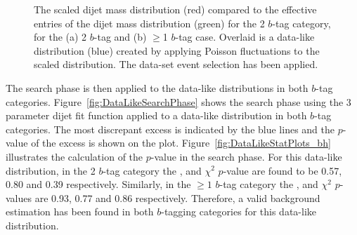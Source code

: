 \begin{figure}[!ht]
  \begin{center}
   \captionsetup[subfigure]{aboveskip=0pt,justification=centering}
  \end{center}
  \caption{The scaled dijet mass distribution (red) compared to the
    effective entries of the dijet mass distribution (green) for the 2 $b$-tag category,
    for the (a) 2 $b$-tag and (b) $\geq$1 $b$-tag case.
    Overlaid is a data-like distribution (blue) created by applying Poisson fluctuations to the scaled distribution.
    The \summer{} data-set event selection has been applied.}
  \label{fig:effEntDataLike}
\end{figure}

The search phase is then applied to the data-like distributions
in both $b$-tag categories.
Figure~\ref{fig:DataLikeSearchPhase} shows the search phase 
using the 3 parameter dijet fit function
applied to a  data-like distribution in both $b$-tag categories.
The most discrepant excess is indicated by the blue lines and the \bh{} \mbox{$p$-value} of the excess is shown on the plot.
Figure~\ref{fig:DataLikeStatPlots_bh} illustrates the calculation of the \bh{} $p$-value in the search phase.
For this data-like distribution, in the 2 $b$-tag category
the \bh{}, \dhunt{} and  $\chi^{2}$ \mbox{$p$-value} are found to be
0.57, 0.80 and 0.39 respectively.
Similarly, in the $\geq1$ $b$-tag category the
\bh{}, \dhunt{} and  $\chi^{2}$ \mbox{$p$-value}s are
0.93, 0.77 and 0.86 respectively.
Therefore, a valid background estimation has been found in both $b$-tagging categories for this data-like distribution.

